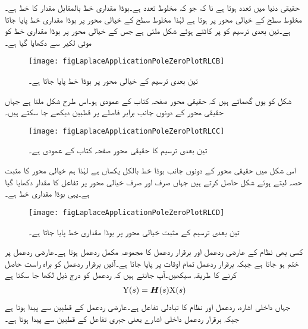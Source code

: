 حقیقی دنیا میں تعدد  ہوتا ہے نا کہ  جو کہ مخلوط تعدد ہے۔بوڈا مقداری خط  بالمقابل مقدار کا خط ہے۔مخلوط سطح کے  خیالی محور پر  ہوتا ہے لہٰذا مخلوط سطح کے خیالی محور پر بوڈا مقداری خط پایا جاتا ہے۔تین بعدی ترسیم کو  پر کاٹتے ہوئے شکل  ملتی ہے جس کے خیالی محور پر بوڈا مقداری خط کو موٹی لکیر سے دکھایا گیا ہے۔    
\begin{figure}
\centering
\texttt{[image: figLaplaceApplicationPoleZeroPlotRLCB]}
\caption{تین بعدی ترسیم کے خیالی محور پر بوڈا خط پایا جاتا ہے۔}
\label{شکل_لاپلاس_استعمال_تین_بعدی_ترسیم_ب}
\end{figure}
شکل  کو یوں گھماتے ہیں کہ حقیقی محور صفحہ کتاب کے عمودی ہو۔اس طرح شکل  ملتا ہے جہاں حقیقی محور کے دونوں جانب برابر فاصلے پر قطبین دیکھے جا سکتے ہیں۔
\begin{figure}
\centering
\texttt{[image: figLaplaceApplicationPoleZeroPlotRLCC]}
\caption{تین بعدی ترسیم کا حقیقی محور صفحہ کتاب کے عمودی ہے۔}
\label{شکل_لاپلاس_استعمال_تین_بعدی_ترسیم_پ}
\end{figure}
اس شکل میں حقیقی محور  کے دونوں جانب بوڈا خط بالکل یکساں ہے لہٰذا ہم خیالی محور کا مثبت حصہ لیتے ہوئے شکل  حاصل کرتے ہیں جہاں صرف اور صرف خیالی محور پر تفاعل کا مقدار دکھایا گیا ہے۔یہی بوڈا مقداری خط ہے۔
\begin{figure}
\centering
\texttt{[image: figLaplaceApplicationPoleZeroPlotRLCD]}
\caption{تین بعدی ترسیم کے مثبت خیالی محور پر بوڈا مقداری خط پایا جاتا ہے۔}
\label{شکل_لاپلاس_استعمال_تین_بعدی_ترسیم_ت}
\end{figure}

کسی بھی نظام کے عارضی ردعمل اور برقرار ردعمل کا مجموعہ مکمل ردعمل ہوتا ہے۔عارضی ردعمل   پر ختم ہو جاتا ہے جبکہ برقرار ردعمل تمام اوقات پر پایا جاتا ہے۔آئیں برقرار ردعمل کو براہ راست حاصل کرنے کا طریقہ سیکھیں۔آپ جانتے ہیں کہ ردعمل کو درج ذیل لکھا جا سکتا ہے
\begin{align}\label{مساوات_لاپلاس_استعمال_برقرار_ردعمل_عمومی}
{\ensuremath{{\textup{Y}}}}(s)={{\boldsymbol{H}}}(s){{\textup{X}}}(s)
\end{align}
جہاں  داخلی اشارہ،  ردعمل اور  نظام کا تبادلی تفاعل ہے۔عارضی ردعمل  کے قطبین سے پیدا ہوتا ہے جبکہ برقرار ردعمل داخلی اشارے یعنی جبری تفاعل کے قطبین سے پیدا ہوتا ہے۔

